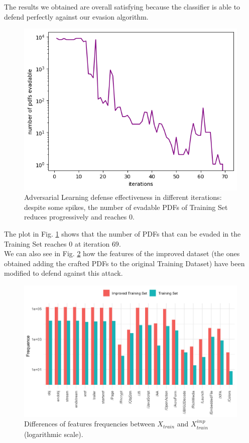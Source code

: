 \documentclass[twocolumn, switch]{article} %
\newcommand\x{0.7}
\begin{document}
The results we obtained are overall satisfying because the classifier is able to defend perfectly against our evasion algorithm.
\vspace{3mm}
\begin{figure}[ht!]
	\centering
	\includegraphics[width=\x\linewidth]{adv_learning.png}
	\caption{Adversarial Learning defense effectiveness in different iterations: despite some spikes, the number of evadable PDFs of Training Set reduces progressively and reaches $0$.}
	\label{fig:advlearn}
	\vspace{2mm}
\end{figure}
The plot in Fig. \ref{fig:advlearn} shows that the number of PDFs that can be evaded in the Training Set reaches $0$ at iteration $69$.\\
We can also see in Fig. \ref{fig:improved} how the features of the improved dataset (the ones obtained adding the crafted PDFs to the original Training Dataset) have been modified to defend against this attack.

\begin{figure}[ht!]
	\centering
	\includegraphics[width=\x\linewidth]{hist_train_improved.png}
	\caption{Differences of features frequencies between $X_{train}$ and $X_{train}^{imp}$ (logarithmic scale).}
	\label{fig:improved}
	\vspace{5mm}
\end{figure}
\end{document}
